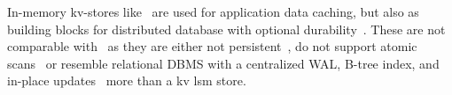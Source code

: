 In-memory kv-stores like~\cite{memcached, ignite, redis} are used for application data caching, but also as building blocks for distributed database with optional durability~\cite{ignite,redis}. These are not comparable with \sys\ as they are either not persistent~\cite{memcached}, do not support atomic scans~\cite{redis} or resemble  relational DBMS with a centralized WAL, B-tree index, and in-place updates~\cite{ignite}  more than a kv lsm store.